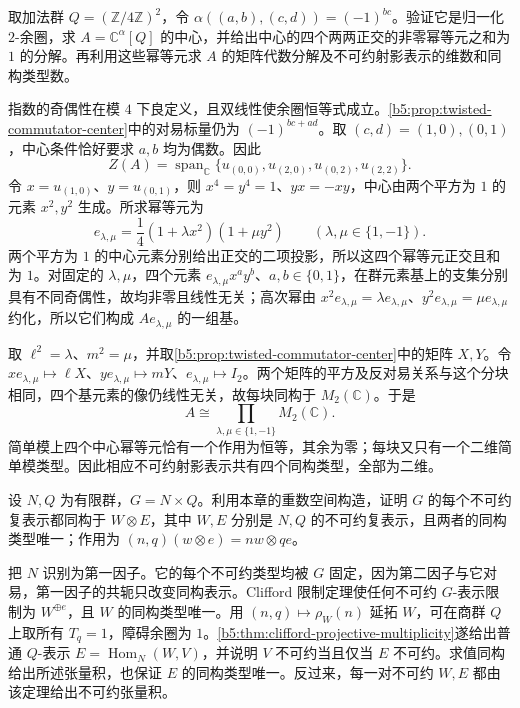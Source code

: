 \begin{exercise}\label{b5:ex:04-twisted-center}
	取加法群 \(Q=(\mathbb Z/4\mathbb Z)^2\)，令 \(\alpha((a,b),(c,d))=(-1)^{bc}\)。验证它是归一化 \(2\)-余圈，求 \(A=\mathbb C^\alpha[Q]\) 的中心，并给出中心的四个两两正交的非零幂等元之和为 \(1\) 的分解。再利用这些幂等元求 \(A\) 的矩阵代数分解及不可约射影表示的维数和同构类型数。
\end{exercise}
\begin{solution}
	指数的奇偶性在模 \(4\) 下良定义，且双线性使余圈恒等式成立。\cref{b5:prop:twisted-commutator-center}中的对易标量仍为 \((-1)^{bc+ad}\)。取 \((c,d)=(1,0),(0,1)\)，中心条件恰好要求 \(a,b\) 均为偶数。因此
	\[
		Z(A)=\operatorname{span}_{\mathbb C} \{u_{(0,0)},u_{(2,0)},u_{(0,2)},u_{(2,2)}\}.
	\]
	令 \(x=u_{(1,0)}\)、\(y=u_{(0,1)}\)，则 \(x^4=y^4=1\)、\(yx=-xy\)，中心由两个平方为 \(1\) 的元素 \(x^2,y^2\) 生成。所求幂等元为
	\[
		e_{\lambda,\mu} =\frac14(1+\lambda x^2)(1+\mu y^2) \qquad(\lambda,\mu\in\{1,-1\}).
	\]
	两个平方为 \(1\) 的中心元素分别给出正交的二项投影，所以这四个幂等元正交且和为 \(1\)。对固定的 \(\lambda,\mu\)，四个元素 \(e_{\lambda,\mu}x^ay^b\)、\(a,b\in\{0,1\}\)，在群元素基上的支集分别具有不同奇偶性，故均非零且线性无关；高次幂由 \(x^2e_{\lambda,\mu}=\lambda e_{\lambda,\mu}\)、\(y^2e_{\lambda,\mu}=\mu e_{\lambda,\mu}\) 约化，所以它们构成 \(Ae_{\lambda,\mu}\) 的一组基。

	取 \(\ell^2=\lambda\)、\(m^2=\mu\)，并取\cref{b5:prop:twisted-commutator-center}中的矩阵 \(X,Y\)。令 \(xe_{\lambda,\mu}\mapsto\ell X\)、\(ye_{\lambda,\mu}\mapsto mY\)、\(e_{\lambda,\mu}\mapsto I_2\)。两个矩阵的平方及反对易关系与这个分块相同，四个基元素的像仍线性无关，故每块同构于 \(M_2(\mathbb C)\)。于是
	\[
		A\cong\prod_{\lambda,\mu\in\{1,-1\}}M_2(\mathbb C).
	\]
	简单模上四个中心幂等元恰有一个作用为恒等，其余为零；每块又只有一个二维简单模类型。因此相应不可约射影表示共有四个同构类型，全部为二维。
\end{solution}

\begin{exercise}\label{b5:ex:04-direct-product-clifford}
	设 \(N,Q\) 为有限群，\(G=N\times Q\)。利用本章的重数空间构造，证明 \(G\) 的每个不可约复表示都同构于 \(W\otimes E\)，其中 \(W,E\) 分别是 \(N,Q\) 的不可约复表示，且两者的同构类型唯一；作用为 \((n,q)(w\otimes e)=nw\otimes qe\)。
\end{exercise}
\begin{solution}
	把 \(N\) 识别为第一因子。它的每个不可约类型均被 \(G\) 固定，因为第二因子与它对易，第一因子的共轭只改变同构表示。Clifford 限制定理使任何不可约 \(G\)-表示限制为 \(W^{\oplus e}\)，且 \(W\) 的同构类型唯一。用 \((n,q)\mapsto\rho_W(n)\) 延拓 \(W\)，可在商群 \(Q\) 上取所有 \(T_q=1\)，障碍余圈为 \(1\)。\cref{b5:thm:clifford-projective-multiplicity}遂给出普通 \(Q\)-表示 \(E=\operatorname{Hom}_N(W,V)\)，并说明 \(V\) 不可约当且仅当 \(E\) 不可约。求值同构给出所述张量积，也保证 \(E\) 的同构类型唯一。反过来，每一对不可约 \(W,E\) 都由该定理给出不可约张量积。
\end{solution}

